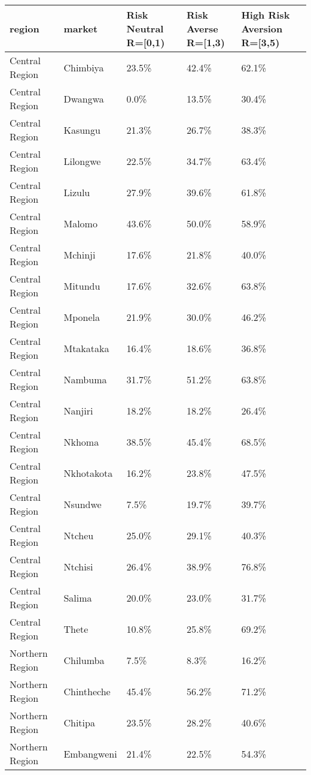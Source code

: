 \begin{table}[ht]
\centering
\begin{tabular}{lllll}
  \hline
region & market & Risk Neutral R=[0,1) & Risk Averse R=[1,3) & High Risk Aversion R=[3,5) \\ 
  \hline
Central Region & Chimbiya & 23.5\% & 42.4\% & 62.1\% \\ 
  Central Region & Dwangwa & 0.0\% & 13.5\% & 30.4\% \\ 
  Central Region & Kasungu & 21.3\% & 26.7\% & 38.3\% \\ 
  Central Region & Lilongwe & 22.5\% & 34.7\% & 63.4\% \\ 
  Central Region & Lizulu & 27.9\% & 39.6\% & 61.8\% \\ 
  Central Region & Malomo & 43.6\% & 50.0\% & 58.9\% \\ 
  Central Region & Mchinji & 17.6\% & 21.8\% & 40.0\% \\ 
  Central Region & Mitundu & 17.6\% & 32.6\% & 63.8\% \\ 
  Central Region & Mponela & 21.9\% & 30.0\% & 46.2\% \\ 
  Central Region & Mtakataka & 16.4\% & 18.6\% & 36.8\% \\ 
  Central Region & Nambuma & 31.7\% & 51.2\% & 63.8\% \\ 
  Central Region & Nanjiri & 18.2\% & 18.2\% & 26.4\% \\ 
  Central Region & Nkhoma & 38.5\% & 45.4\% & 68.5\% \\ 
  Central Region & Nkhotakota & 16.2\% & 23.8\% & 47.5\% \\ 
  Central Region & Nsundwe & 7.5\% & 19.7\% & 39.7\% \\ 
  Central Region & Ntcheu & 25.0\% & 29.1\% & 40.3\% \\ 
  Central Region & Ntchisi & 26.4\% & 38.9\% & 76.8\% \\ 
  Central Region & Salima & 20.0\% & 23.0\% & 31.7\% \\ 
  Central Region & Thete & 10.8\% & 25.8\% & 69.2\% \\ 
  Northern Region & Chilumba & 7.5\% & 8.3\% & 16.2\% \\ 
  Northern Region & Chintheche & 45.4\% & 56.2\% & 71.2\% \\ 
  Northern Region & Chitipa & 23.5\% & 28.2\% & 40.6\% \\ 
  Northern Region & Embangweni & 21.4\% & 22.5\% & 54.3\% \\ 

\end{tabular}
\end{table}
